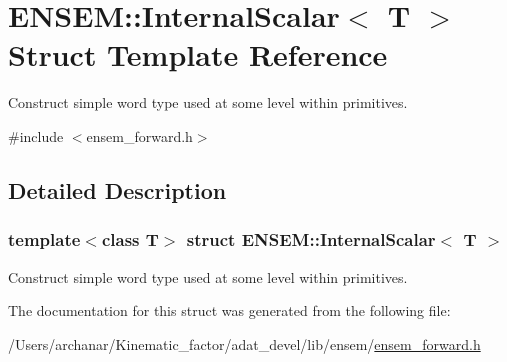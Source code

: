 \hypertarget{structENSEM_1_1InternalScalar}{}\section{E\+N\+S\+EM\+:\+:Internal\+Scalar$<$ T $>$ Struct Template Reference}
\label{structENSEM_1_1InternalScalar}


Construct simple word type used at some level within primitives.  




{\ttfamily \#include $<$ensem\+\_\+forward.\+h$>$}



\subsection{Detailed Description}
\subsubsection*{template$<$class T$>$\newline
struct E\+N\+S\+E\+M\+::\+Internal\+Scalar$<$ T $>$}

Construct simple word type used at some level within primitives. 

The documentation for this struct was generated from the following file\+:\begin{DoxyCompactItemize}
\item 
/\+Users/archanar/\+Kinematic\+\_\+factor/adat\+\_\+devel/lib/ensem/\mbox{\hyperlink{lib_2ensem_2ensem__forward_8h}{ensem\+\_\+forward.\+h}}\end{DoxyCompactItemize}
